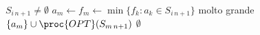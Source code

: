 \begin{codebox}
\li \If $S_{i\, n+1} \neq \emptyset$
\li \Then
		$a_m \gets f_m \gets \min\{f_k : a_k \in S_{i\, n+1}\}$
			\Comment molto grande
\li		\Return $\{a_m\} \cup \proc{OPT}(S_{m\, n+1})$
	\Else
\li	\Return $\emptyset$
\end{codebox}